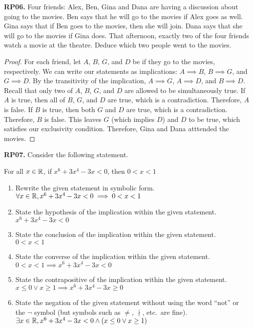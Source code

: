 \documentclass[11pt]{article}
\begin{document}
\textbf{RP06.} Four friends: Alex, Ben, Gina and Dana are having a discussion about going to the movies.
Ben says that he will go to the movies if Alex goes as well.
Gina says that if Ben goes to the movies, then she will join.
Dana says that she will go to the movies if Gina does.
That afternoon, exactly two of the four friends watch a movie at the theatre.
Deduce which two people went to the movies.
\begin{proof}
  For each friend, let $A$, $B$, $G$, and $D$ be if they go to the movies, respectively.
  We can write our statements as implications: $A \implies B$, $B \implies G$, and $G \implies D$.
  By the transitivity of the implication, $A \implies G$, $A \implies D$, and $B \implies D$.
  Recall that only two of $A$, $B$, $G$, and $D$ are allowed to be simultaneously true.
  If $A$ is true, then all of $B$, $G$, and $D$ are true, which is a contradiction.
  Therefore, $A$ is false.
  If $B$ is true, then both $G$ and $D$ are true, which is a contradiction.
  Therefore, $B$ is false.
  This leaves $G$ (which implies $D$) and $D$ to be true, which satisfies our exclusivity condition.
  Therefore, Gina and Dana atttended the movies.
\end{proof}


\textbf{RP07.} Consider the following statement.
\begin{center}
  For all $x\in\mathbb{R}$, if $x^6 + 3x^4 - 3x < 0$, then $0 < x < 1$
\end{center}
\begin{enumerate}
  \item Rewrite the given statement in symbolic form. \\
        $\forall x\in\mathbb{R}, x^6 + 3x^4 - 3x < 0 \implies 0 < x < 1$
  \item State the hypothesis of the implication within the given statement. \\
        $x^6 + 3x^4 - 3x < 0$
  \item State the conclusion of the implication within the given statement. \\
        $0 < x < 1$
  \item State the converse of the implication within the given statement. \\
        $0 < x < 1 \implies x^6 + 3x^4 - 3x < 0$
  \item State the contrapositive of the implication within the given statement. \\
        $x \leq 0 \lor x \geq 1 \implies x^6 + 3x^4 - 3x \geq 0$
  \item State the negation of the given statement without using the word ``not'' or the $\lnot$ symbol (but symbols such as $\neq$, $\nmid$, etc.\ are fine). \\
        $\exists x\in\mathbb{R}, x^6 + 3x^4 - 3x < 0 \land (x \leq 0 \lor x \geq 1)$
\end{enumerate}
\end{document}
